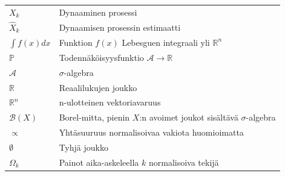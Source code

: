 \documentclass[
  12pt,
  a4paper, twoside]{book}
\begin{document}
\begin{table}
\begin{tabular}[t]{ll}
$X_k$ & Dynaaminen prosessi\\
$\hat{X}_k$ & Dynaamisen prosessin estimaatti\\
$\int f(x)dx$ & Funktion $f(x)$ Lebesguen integraali yli $\mathbb{R}^n$\\
\addlinespace
$\mathbb{P}$ & Todennäköisyysfunktio $\mathcal{A}\rightarrow\mathbb{R}$\\
$\mathcal{A}$ & $\sigma$-algebra\\
$\mathbb{R}$ & Reaalilukujen joukko\\
$\mathbb{R}^n$ & n-ulotteinen vektoriavaruus\\
$\mathcal{B}(X)$ & Borel-mitta, pienin $X$:n avoimet joukot sisältävä $\sigma$-algebra\\
\addlinespace
$\propto$ & Yhtäsuuruus normalisoivaa vakiota huomioimatta\\
$\emptyset$ & Tyhjä joukko\\
$\Omega_k$ & Painot aika-askeleella $k$ normalisoiva tekijä\\
\bottomrule
\end{tabular}
\end{table}
\end{document}
